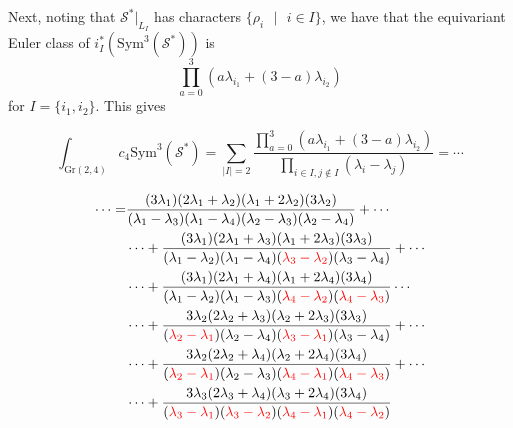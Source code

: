 \documentclass{amsart}
\begin{document}
Next, noting that $\mathcal{S}^*\bigg|_{L_I}$ has characters $\{\rho_i\text{ }|\text{ }i\in I\}$, we have that the equivariant Euler class of $i_I^*(\text{Sym}^3(\mathcal{S}^*))$ is \[ \prod_{a=0}^3 \left( a\lambda_{i_1} + (3-a)\lambda_{i_2}  \right) \] for $I = \{i_1, i_2\}$.  This gives 

\[ \int_{\text{Gr}(2,4)}c_4 \text{Sym}^3(\mathcal{S}^*) = \sum_{|I|=2} \frac{ \prod_{a=0}^3 (a\lambda_{i_1} + (3-a)\lambda_{i_2} ) }{\prod_{i\in I, j\not\in I} (\lambda_i - \lambda_j) } = \cdots \]


\begin{align*}
\cdots = &\frac{(3\lambda_1)(2\lambda_1 + \lambda_2)(\lambda_1+2\lambda_2)(3\lambda_2)}{(\lambda_1-\lambda_3)(\lambda_1-\lambda_4)(\lambda_2-\lambda_3)(\lambda_2-\lambda_4)} + \cdots \\
&\cdots + \frac{(3\lambda_1)(2\lambda_1+\lambda_3)(\lambda_1+2\lambda_3)(3\lambda_3)}{(\lambda_1-\lambda_2)(\lambda_1-\lambda_4)(\color{red}{\lambda_3-\lambda_2}\color{black})(\lambda_3-\lambda_4)} + \cdots \\
&\cdots + \frac{(3\lambda_1)(2\lambda_1 + \lambda_4)(\lambda_1+2\lambda_4)(3\lambda_4)}{(\lambda_1-\lambda_2)(\lambda_1-\lambda_3)(\color{red}{\lambda_4-\lambda_2}\color{black})(\color{red}{\lambda_4-\lambda_3} \color{black})} \cdots \\
&\cdots + \frac{3\lambda_2(2\lambda_2+\lambda_3)(\lambda_2+2\lambda_3)(3\lambda_3)}{(\color{red}{\lambda_2-\lambda_1}\color{black})(\lambda_2-\lambda_4)(\color{red}{\lambda_3-\lambda_1}\color{black})(\lambda_3-\lambda_4)} +\cdots \\
&\cdots + \frac{3\lambda_2(2\lambda_2+\lambda_4)(\lambda_2+2\lambda_4)(3\lambda_4)}{(\color{red}{\lambda_2-\lambda_1}\color{black})(\lambda_2-\lambda_3)(\color{red}{\lambda_4-\lambda_1}\color{black})(\color{red}{\lambda_4-\lambda_3\color{black})}} +\cdots \\
&\cdots + \frac{3\lambda_3(2\lambda_3+\lambda_4)(\lambda_3+2\lambda_4)(3\lambda_4)}{(\color{red}{\lambda_3-\lambda_1}\color{black})(\color{red}{\lambda_3-\lambda_2}\color{black})(\color{red}{\lambda_4-\lambda_1}\color{black})(\color{red}{\lambda_4-\lambda_2}\color{black})} 
\end{align*}
\end{document}
